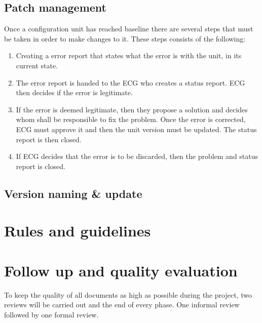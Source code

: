 \documentclass{article}
\begin{document}
    \subsection{Patch management}
        Once a configuration unit has reached baseline there are several steps
        that must be taken in order to make changes to it.
        These steps consists of the following:
        \begin{enumerate}
            \item Creating a error report that states what the
                    error is with the unit, in its current state.
            \item The error report is handed to the ECG who creates a 
                    status report. ECG then decides if the error is legitimate.
            \item If the error is deemed legitimate, then they
                    propose a solution and
                    decides whom shall be responsible to fix the problem.
                    Once the error is corrected, ECG must approve it
                    and then the unit version must be updated.
                    The status report is then closed.
            \item If ECG decides that the error is to be discarded, then
                    the problem and status report is closed.
                
        \end{enumerate}
        

    \subsection{Version naming \& update}
        
        
    


\section{Rules and guidelines} %

% 
    
\section{Follow up and quality evaluation}
    To keep the quality of all documents as high as possible during the project,
    two reviews will be carried out and the end of every phase. One informal review
    followed by one formal review.
    
\end{document}
